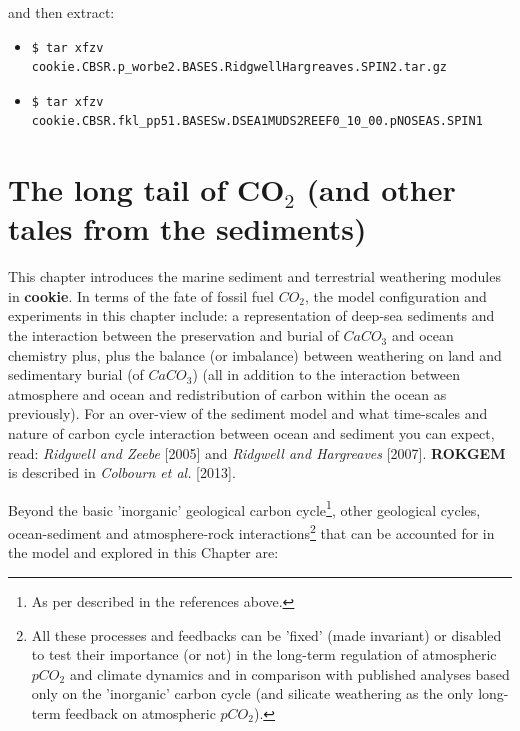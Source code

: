 \vspace{1mm}
\noindent and then extract:

\vspace{2mm}
\begin{itemize}[noitemsep]
\vspace{1mm}
\item [] \vspace{-0mm}\small\begin{verbatim}
$ tar xfzv cookie.CBSR.p_worbe2.BASES.RidgwellHargreaves.SPIN2.tar.gz
\end{verbatim}\normalsize\vspace{-0mm}
\vspace{1mm}
\item [] \vspace{-0mm}\small\begin{verbatim}
$ tar xfzv cookie.CBSR.fkl_pp51.BASESw.DSEA1MUDS2REEF0_10_00.pNOSEAS.SPIN1
\end{verbatim}\normalsize\vspace{-0mm}
\end{itemize}


\newpage

\section*{The long tail of CO$_{2}$ (and other tales from the sediments)}

This chapter introduces the marine sediment and terrestrial weathering modules in \textbf{cookie}. In terms of the fate of fossil fuel \(CO_{2}\), the model configuration and experiments in this chapter include: a representation of deep-sea sediments and the interaction between the preservation and burial of \(CaCO_{3}\) and ocean chemistry plus, plus the balance (or imbalance) between weathering on land and sedimentary burial (of \(CaCO_{3}\)) (all in addition to the interaction between atmosphere and ocean and redistribution of carbon within the ocean as previously). For an over-view of the sediment model and what time-scales and nature of carbon cycle interaction between ocean and sediment you can expect, read: \textit{Ridgwell and Zeebe} [2005] and \textit{Ridgwell and Hargreaves} [2007]. \textbf{ROKGEM} is described in \textit{Colbourn et al.} [2013].

Beyond the basic 'inorganic' geological carbon cycle\footnote{As per described in the references above.}, other geological cycles, ocean-sediment and atmosphere-rock interactions\footnote{All these processes and feedbacks can be 'fixed' (made invariant) or disabled to test their importance (or not) in the long-term regulation of atmospheric \(pCO_{2}\) and climate dynamics and in comparison with published analyses based only on the 'inorganic' carbon cycle (and silicate weathering as the only long-term feedback on atmospheric \(pCO_{2}\)).}  that can be accounted for in the model and explored in this Chapter are:

